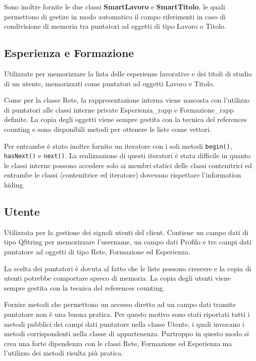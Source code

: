 \documentclass[a4paper]{article}
\begin{document}
Sono inoltre fornite le due classi \textbf{SmartLavoro} e \textbf{SmartTitolo}, le quali permettono di gestire in modo automatico il campo riferimenti in caso di condivisione di memoria tra puntatori ad oggetti di tipo Lavoro o Titolo.

\subsection*{Esperienza e Formazione}
Utilizzate per memorizzare la lista delle esperienze lavorative e dei titoli di studio di un utente, memorizzati come puntatori ad oggetti Lavoro e Titolo.

Come per la classe Rete, la rappresentazione interna viene nascosta con l'utilizzo di puntatori alle classi interne private Esperienza\_rapp e Formazione\_rapp definite. La copia degli oggetti viene sempre gestita con la tecnica del references counting e sono disponibili metodi per ottenere le liste come vettori.

Per entrambe è stato inoltre fornito un iteratore con i soli metodi \texttt{begin()}, \texttt{hasNext()} e \texttt{next()}. La realizzazione di questi iteratori è stata difficile in quanto le classi interne possono accedere solo ai membri statici delle classi contenitrici ed entrambe le classi (contenitrice ed iteratore) dovevano rispettare l'information hiding.

\subsection*{Utente}
Utilizzata per la gestione dei signoli utenti del client. Contiene un campo dati di tipo QString per memorizzare l'username, un campo dati Profilo e tre campi dati puntatore ad oggetti di tipo Rete, Formazione ed Esperienza. 

La scelta dei puntatori è dovuta al fatto che le liste possono crescere e la copia di utenti potrebbe comportare spreco di memoria. La copia degli utenti viene sempre gestita con la tecnica del references counting.

Fornire metodi che permettono un accesso diretto ad un campo dati tramite puntatore non è una buona pratica. Per questo motivo sono stati riportati tutti i metodi pubblici dei campi dati puntatore nella classe Utente, i quali invocano i metodi corrispondenti nella classe di appartenenza. Purtroppo in questo modo si crea una forte dipendenza con le classi Rete, Formazione ed Esperienza ma l'utilizzo dei metodi risulta più pratica.
\end{document}
